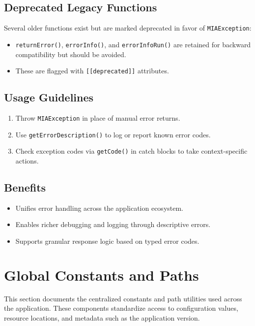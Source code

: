 \subsection*{Deprecated Legacy Functions}
Several older functions exist but are marked deprecated in favor of \texttt{MIAException}:
\begin{itemize}
	\item \texttt{returnError()}, \texttt{errorInfo()}, and \texttt{errorInfoRun()} are retained for backward compatibility but should be avoided.
	\item These are flagged with \texttt{[[deprecated]]} attributes.
\end{itemize}

\subsection*{Usage Guidelines}
\begin{enumerate}
	\item Throw \texttt{MIAException} in place of manual error returns.
	\item Use \texttt{getErrorDescription()} to log or report known error codes.
	\item Check exception codes via \texttt{getCode()} in catch blocks to take context-specific actions.
\end{enumerate}

\subsection*{Benefits}
\begin{itemize}
	\item Unifies error handling across the application ecosystem.
	\item Enables richer debugging and logging through descriptive errors.
	\item Supports granular response logic based on typed error codes.
\end{itemize}








\section{Global Constants and Paths}

This section documents the centralized constants and path utilities used across the application. These components standardize access to configuration values, resource locations, and metadata such as the application version.

